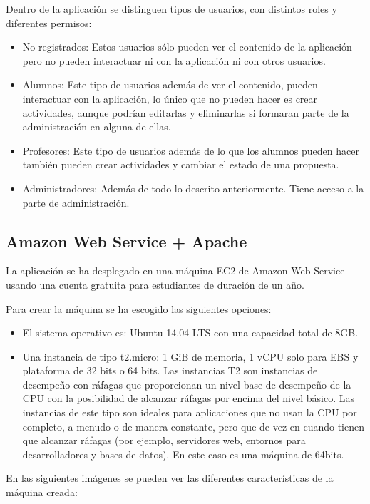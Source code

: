 Dentro de la aplicación se distinguen tipos de usuarios, con distintos roles y diferentes permisos:

\begin{itemize}
\item No registrados: Estos usuarios sólo pueden ver el contenido de la aplicación pero no pueden interactuar ni con la aplicación ni con otros usuarios.
\item Alumnos: Este tipo de usuarios además de ver el contenido, pueden interactuar con la aplicación, lo único que no pueden hacer es crear actividades, aunque podrían editarlas y eliminarlas si formaran parte de la administración en alguna de ellas.
\item Profesores: Este tipo de usuarios además de lo que los alumnos pueden hacer también pueden crear actividades y cambiar el estado de una propuesta.
\item Administradores: Además de todo lo descrito anteriormente. Tiene acceso a la parte de administración.
\end{itemize}


\subsection{Amazon Web Service + Apache} 
\label{subsec:aws_apache}

La aplicación se ha desplegado en una máquina EC2 de Amazon Web Service usando una cuenta gratuita para estudiantes de duración de un año.

Para crear la máquina se ha escogido las siguientes opciones:
\begin{itemize}
\item El sistema operativo es: Ubuntu 14.04 LTS con una capacidad total de 8GB.
\item Una instancia de tipo t2.micro: 1 GiB de memoria, 1 vCPU solo para EBS y plataforma de 32 bits o 64 bits. Las instancias T2 son instancias de desempeño con ráfagas que proporcionan un nivel base de desempeño de la CPU con la posibilidad de alcanzar ráfagas por encima del nivel básico. Las instancias de este tipo son ideales para aplicaciones que no usan la CPU por completo, a menudo o de manera constante, pero que de vez en cuando tienen que alcanzar ráfagas (por ejemplo, servidores web, entornos para desarrolladores y bases de datos). En este caso es una máquina de 64bits.
\end{itemize}

En las siguientes imágenes se pueden ver las diferentes características de la máquina creada:

